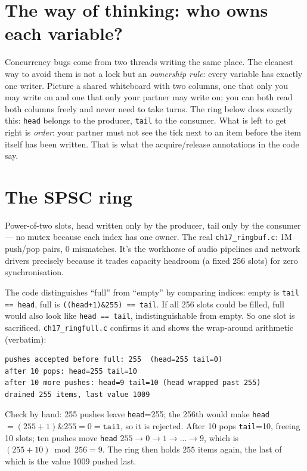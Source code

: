 \section{The way of thinking: who owns each variable?}

Concurrency bugs come from two threads writing the same place. The
cleanest way to avoid them is not a lock but an \emph{ownership
rule}: every variable has exactly one writer. Picture a shared
whiteboard with two columns, one that only you may write on and one
that only your partner may write on; you can both read both columns
freely and never need to take turns. The ring below does exactly this:
\texttt{head} belongs to the producer, \texttt{tail} to the consumer.
What is left to get right is \emph{order}: your partner must not see
the tick next to an item before the item itself has been written. That
is what the acquire/release annotations in the code say.

\section{The SPSC ring}


Power-of-two slots, head written only by the producer, tail only
by the consumer --- no mutex because each index has one owner.
The real \texttt{ch17\_ringbuf.c}: 1M push/pop pairs, 0
mismatches. It's the workhorse of audio pipelines and network
drivers precisely because it trades capacity headroom (a fixed
256 slots) for zero synchronisation.

\begin{example}
The code distinguishes ``full'' from ``empty'' by comparing indices:
empty is \texttt{tail == head}, full is \texttt{((head+1)\&255) == tail}.
If all 256 slots could be filled, full would also look like
\texttt{head == tail}, indistinguishable from empty. So one slot is
sacrificed. \texttt{ch17\_ringfull.c} confirms it and shows the
wrap-around arithmetic (verbatim):

{\scriptsize
\begin{verbatim}
pushes accepted before full: 255  (head=255 tail=0)
after 10 pops: head=255 tail=10
after 10 more pushes: head=9 tail=10 (head wrapped past 255)
drained 255 items, last value 1009
\end{verbatim}
}
Check by hand: 255 pushes leave \texttt{head}=255; the 256th would make
\texttt{head}$=(255+1)\&255=0=\texttt{tail}$, so it is rejected. After 10
pops \texttt{tail}=10, freeing 10 slots; ten pushes move
\texttt{head} $255\to0\to1\to\dots\to9$, which is
$(255+10)\bmod 256=9$. The ring then holds $255$ items again, the
last of which is the value 1009 pushed last.
\end{example}

